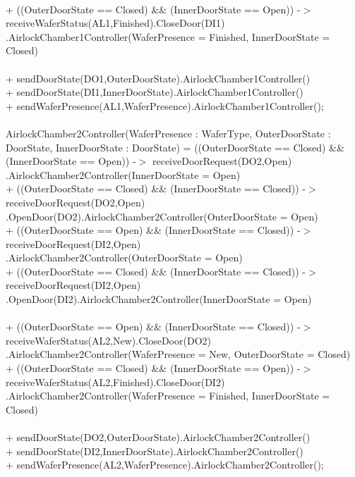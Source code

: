 \documentclass[a4paper,12pt]{article}
\begin{document}
\\+ ((OuterDoorState == Closed) \&\& (InnerDoorState == Open)) -$>$ receiveWaferStatus(AL1,Finished).CloseDoor(DI1)\\.AirlockChamber1Controller(WaferPresence = Finished, InnerDoorState = Closed)
\\
\\+ sendDoorState(DO1,OuterDoorState).AirlockChamber1Controller()
\\+ sendDoorState(DI1,InnerDoorState).AirlockChamber1Controller()
\\+ sendWaferPresence(AL1,WaferPresence).AirlockChamber1Controller();
\\
\\AirlockChamber2Controller(WaferPresence : WaferType, OuterDoorState : DoorState, InnerDoorState : DoorState) =
((OuterDoorState == Closed) \&\& (InnerDoorState == Open)) -$>$ receiveDoorRequest(DO2,Open)
\\.AirlockChamber2Controller(InnerDoorState = Open)
\\+ ((OuterDoorState == Closed) \&\& (InnerDoorState == Closed)) -$>$ receiveDoorRequest(DO2,Open)
\\.OpenDoor(DO2).AirlockChamber2Controller(OuterDoorState = Open)
\\+ ((OuterDoorState == Open) \&\& (InnerDoorState == Closed)) -$>$ receiveDoorRequest(DI2,Open)
\\.AirlockChamber2Controller(OuterDoorState = Open)
\\+ ((OuterDoorState == Closed) \&\& (InnerDoorState == Closed)) -$>$ receiveDoorRequest(DI2,Open)
\\.OpenDoor(DI2).AirlockChamber2Controller(InnerDoorState = Open)
\\
\\+ ((OuterDoorState == Open) \&\& (InnerDoorState == Closed)) -$>$ receiveWaferStatus(AL2,New).CloseDoor(DO2)
\\.AirlockChamber2Controller(WaferPresence = New, OuterDoorState = Closed)
\\+ ((OuterDoorState == Closed) \&\& (InnerDoorState == Open)) -$>$ receiveWaferStatus(AL2,Finished).CloseDoor(DI2)\\.AirlockChamber2Controller(WaferPresence = Finished, InnerDoorState = Closed)
\\
\\+ sendDoorState(DO2,OuterDoorState).AirlockChamber2Controller()
\\+ sendDoorState(DI2,InnerDoorState).AirlockChamber2Controller()
\\+ sendWaferPresence(AL2,WaferPresence).AirlockChamber2Controller();
\end{document}
